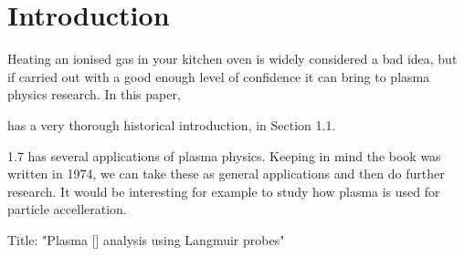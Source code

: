 \section{Introduction}
Heating an ionised gas in your kitchen oven is widely considered a bad idea, but if carried out with a good enough level of confidence it can bring to plasma physics research.
In this paper,

\cite{piel_plasma_2017} has a very thorough historical introduction, in Section 1.1.

\cite{chen_introduction_2006} 1.7 has several applications of plasma physics.
Keeping in mind the book was written in 1974, we can take these as general applications and then do further research.
It would be interesting for example to study how plasma is  used for particle accelleration.

Title: "Plasma [] analysis using Langmuir probes"